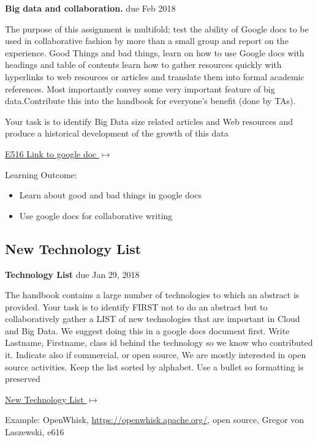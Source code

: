 \begin{exercise}\label{E:616-big-data-and-collaboration} {\bf Big
    data and collaboration.} due Feb 2018
    
  The purpose of this assignment is
  multifold; test the ability of Google docs to be used in
  collaborative fashion by more than a small group and report on the
  experience. Good Things and bad things, learn on how to use Google
  docs with headings and table of contents learn how to gather
  resources quickly with hyperlinks to web resources or articles and
  translate them into formal academic references. Most importantly
  convey some very important feature of big data.Contribute this into
  the handbook for everyone's benefit (done by TAs).  \smallskip

   Your task is to identify Big Data size related
  articles and Web resources and produce a historical development of
  the growth of this data

  {\hfill
    \href{https://docs.google.com/document/d/1ZHNdhX_Jx7uBQo0kthSYQ6TQR8_KNbgOwH2EuqBQcjY/edit?usp=sharing}{E516
      Link to google doc $\mapsto$}}


\end{exercise}

Learning Outcome:

\begin{itemize}
\item Learn about good and bad things in google docs
\item Use google docs for collaborative writing 
\end{itemize}


\subsection{New Technology List}
\label{E:616-new-tech}

\begin{exercise} {\bf Technology List} due Jan 29, 2018

 The handbook contains a large number of technologies to which an
 abstract is provided. Your task is to identify FIRST not to do an abstract but to
 collaboratively gather a LIST of new technologies that are important
 in Cloud and Big Data. We suggest doing this in a google docs document
 first. Write Lastname, Firstname, class id behind the technology so we
 know who contributed it. Indicate also if commercial, or open source,
 We are mostly interested in open source activities. Keep the list
 sorted by alphabet. Use a bullet so formatting is preserved

\smallskip

{\hfill \href{https://docs.google.com/document/d/1LeHGHTSBbaPXYVor0efhmi5W7JJjS7EQHABHqgRAPuU/edit?usp=sharing}{New Technology List $\mapsto$}}

\smallskip

Example: OpenWhisk, \url{https://openwhisk.apache.org/}, open source, Gregor von Laszewski, e616

\end{exercise}

